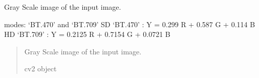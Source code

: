 \documentclass[letterpaper,10pt,english]{sphinxmanual}
\begin{document}
\begin{fulllineitems}
\label{\detokenize{forensicfit.utils.image_tools:forensicfit.utils.image_tools.to_gray}}
\pysigstartsignatures
{}
\pysigstopsignatures
\sphinxAtStartPar
Gray Scale image of the input image.

\sphinxAtStartPar
modes: ‘BT.470’ and ‘BT.709’
SD ‘BT.470’ : Y = 0.299 R + 0.587 G + 0.114 B
HD ‘BT.709’ : Y = 0.2125 R + 0.7154 G + 0.0721 B
\begin{quote}\begin{description}
\sphinxAtStartPar
{}

\sphinxAtStartPar
{} \textendash{} Gray Scale image of the input image.

\sphinxAtStartPar
cv2 object

\end{description}\end{quote}

\end{fulllineitems}


\begin{fulllineitems}
\label{\detokenize{forensicfit.utils.image_tools:forensicfit.utils.image_tools.to_rbg}}
\pysigstartsignatures
{}
\pysigstopsignatures
\end{fulllineitems}


\begin{fulllineitems}
\label{\detokenize{forensicfit.utils.image_tools:forensicfit.utils.image_tools.flip}}
\pysigstartsignatures
{}
\pysigstopsignatures
\end{fulllineitems}
\end{document}
